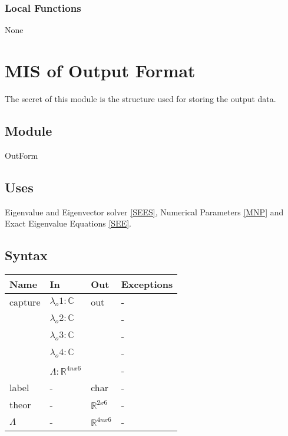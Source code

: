 \documentclass[12pt, titlepage]{article}
\begin{document}
\subsubsection{Local Functions}
None
\newpage

\section{MIS of Output Format} \label{OFM}

The secret of this module is the structure used for storing the output data.

\subsection{Module}

OutForm

\subsection{Uses}

Eigenvalue and Eigenvector solver \ref{SEES}, Numerical 
Parameters \ref{MNP} and Exact Eigenvalue Equations \ref{SEE}. 

\subsection{Syntax} 

\begin{center}
	\begin{tabular}{p{3cm} p{3cm} p{3cm} >{\raggedright\arraybackslash}p{7cm}}
		\toprule
		\textbf{Name} & \textbf{In} & \textbf{Out} & \textbf{Exceptions}  \\
		\hline
		capture & $\lambda_{o}1 :\mathbb{C}$ & out & - \\ 
		 & $\lambda_{o}2 :\mathbb{C}$ &  & - \\ 
		 & $\lambda_{o}3 :\mathbb{C}$ &  & - \\
		 & $\lambda_{o}4 :\mathbb{C}$ &  & - \\
		 & $\Lambda : \mathbb{R}^{4n x 6}$ & & -\\
		label & - & char & - \\ 
		theor & - & $\mathbb{R}^{2 x 6}$ & - \\
		$\Lambda$ & - & $\mathbb{R}^{4n x 6}$ & - \\
		\hline
	\end{tabular}
\end{center}
\end{document}
